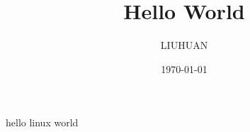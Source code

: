 \documentclass[12pt]{article}
\begin{document}
\title{Hello World}
\author{LIUHUAN}
\date{\today}
\maketitle
hello linux world
\end{document}
